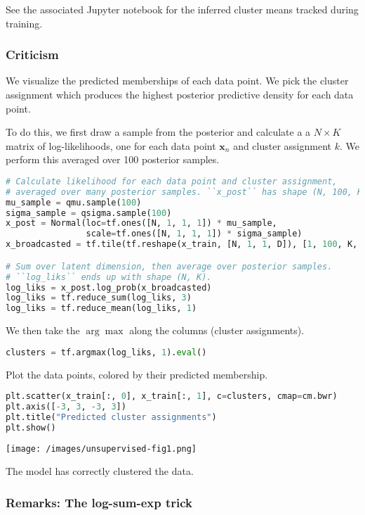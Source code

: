 See the associated Jupyter notebook for the inferred cluster means
tracked during training.

\subsubsection{Criticism}

We visualize the predicted memberships of each data point. We pick
the cluster assignment which produces the highest posterior predictive
density for each data point.

To do this, we first draw a sample from the posterior and calculate a
a $N\times K$ matrix of log-likelihoods, one for each data point
$\mathbf{x}_n$ and cluster assignment $k$.
We perform this averaged over 100 posterior samples.

\begin{lstlisting}[language=Python]
# Calculate likelihood for each data point and cluster assignment,
# averaged over many posterior samples. ``x_post`` has shape (N, 100, K, D).
mu_sample = qmu.sample(100)
sigma_sample = qsigma.sample(100)
x_post = Normal(loc=tf.ones([N, 1, 1, 1]) * mu_sample,
                scale=tf.ones([N, 1, 1, 1]) * sigma_sample)
x_broadcasted = tf.tile(tf.reshape(x_train, [N, 1, 1, D]), [1, 100, K, 1])

# Sum over latent dimension, then average over posterior samples.
# ``log_liks`` ends up with shape (N, K).
log_liks = x_post.log_prob(x_broadcasted)
log_liks = tf.reduce_sum(log_liks, 3)
log_liks = tf.reduce_mean(log_liks, 1)
\end{lstlisting}

We then take the $\arg\max$ along the columns (cluster assignments).
\begin{lstlisting}[language=Python]
clusters = tf.argmax(log_liks, 1).eval()
\end{lstlisting}

Plot the data points, colored by their predicted membership.
\begin{lstlisting}[language=Python]
plt.scatter(x_train[:, 0], x_train[:, 1], c=clusters, cmap=cm.bwr)
plt.axis([-3, 3, -3, 3])
plt.title("Predicted cluster assignments")
plt.show()
\end{lstlisting}

\texttt{[image: /images/unsupervised-fig1.png]}

The model has correctly clustered the data.

\subsubsection{Remarks: The log-sum-exp trick}


